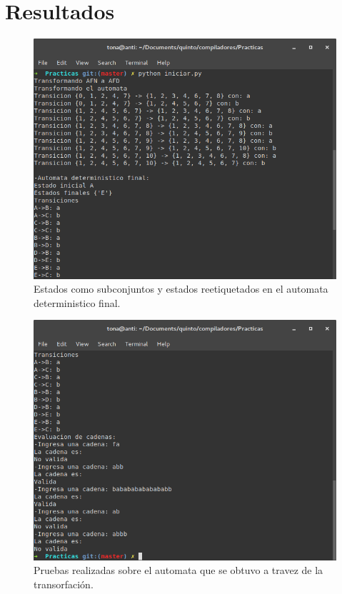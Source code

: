 \documentclass[titlepage]{article}
\begin{document}
\section{Resultados}
    \begin{figure}[H]
        \begin{center}
        \includegraphics[width=\textwidth]{1.png}
        \caption{Estados como subconjuntos y estados reetiquetados en el automata deterministico final.}
        \label{fig:creacion}
        \end{center}
    \end{figure}
    \begin{figure}[H]
        \begin{center}
        \includegraphics[width=\textwidth]{2.png}
        \caption{Pruebas realizadas sobre el automata que se obtuvo a travez de la transorfación.}
        \label{fig:pruebas}
        \end{center}
    \end{figure}
\end{document}
